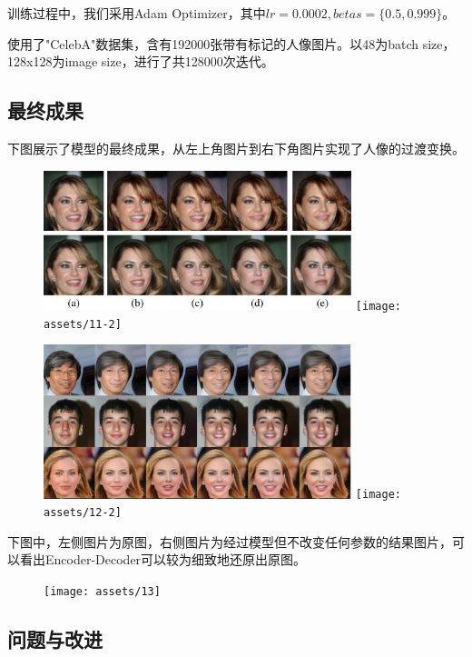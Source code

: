 \documentclass[UTF8,a4paper，12pt]{article}
\theoremstyle{theorem}
\theoremstyle{definition}
\begin{document}
训练过程中，我们采用Adam Optimizer，其中$lr = 0.0002, betas = \{0.5, 0.999\}$。

使用了"CelebA"数据集，含有192000张带有标记的人像图片。以48为batch size，128x128为image size，进行了共128000次迭代。

\subsection{最终成果}

下图展示了模型的最终成果，从左上角图片到右下角图片实现了人像的过渡变换。

\begin{figure}[htbp]
	\centering
	\includegraphics[width=0.8\textwidth]{assets/11}
	\texttt{[image: assets/11-2]}
	\caption{}
\end{figure}

\begin{figure}[htbp]
	\centering
	\includegraphics[width=0.8\textwidth]{assets/12}
	\texttt{[image: assets/12-2]}
	\caption{}
\end{figure}

下图中，左侧图片为原图，右侧图片为经过模型但不改变任何参数的结果图片，可以看出Encoder-Decoder可以较为细致地还原出原图。

\begin{figure}[htbp]
	\centering
	\texttt{[image: assets/13]}
	\caption{}
\end{figure}

\subsection{问题与改进}
\end{document}

